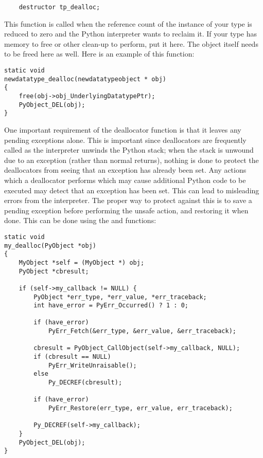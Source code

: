 \begin{verbatim}
    destructor tp_dealloc;
\end{verbatim}

This function is called when the reference count of the instance of
your type is reduced to zero and the Python interpreter wants to
reclaim it.  If your type has memory to free or other clean-up to
perform, put it here.  The object itself needs to be freed here as
well.  Here is an example of this function:

\begin{verbatim}
static void
newdatatype_dealloc(newdatatypeobject * obj)
{
    free(obj->obj_UnderlyingDatatypePtr);
    PyObject_DEL(obj);
}
\end{verbatim}

One important requirement of the deallocator function is that it
leaves any pending exceptions alone.  This is important since
deallocators are frequently called as the interpreter unwinds the
Python stack; when the stack is unwound due to an exception (rather
than normal returns), nothing is done to protect the deallocators from
seeing that an exception has already been set.  Any actions which a
deallocator performs which may cause additional Python code to be
executed may detect that an exception has been set.  This can lead to
misleading errors from the interpreter.  The proper way to protect
against this is to save a pending exception before performing the
unsafe action, and restoring it when done.  This can be done using the
 and
 functions:

\begin{verbatim}
static void
my_dealloc(PyObject *obj)
{
    MyObject *self = (MyObject *) obj;
    PyObject *cbresult;

    if (self->my_callback != NULL) {
        PyObject *err_type, *err_value, *err_traceback;
        int have_error = PyErr_Occurred() ? 1 : 0;

        if (have_error)
            PyErr_Fetch(&err_type, &err_value, &err_traceback);

        cbresult = PyObject_CallObject(self->my_callback, NULL);
        if (cbresult == NULL)
            PyErr_WriteUnraisable();
        else
            Py_DECREF(cbresult);

        if (have_error)
            PyErr_Restore(err_type, err_value, err_traceback);

        Py_DECREF(self->my_callback);
    }
    PyObject_DEL(obj);
}
\end{verbatim}


